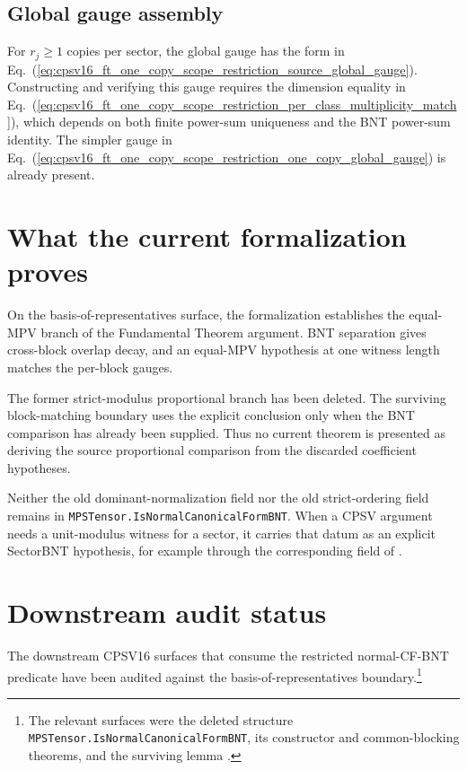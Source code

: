 \documentclass{article}
\begin{document}
\subsection{Global gauge assembly}

For $r_j\geq1$ copies per sector, the global gauge has the form in
Eq.~(\ref{eq:cpsv16_ft_one_copy_scope_restriction_source_global_gauge}).
Constructing and verifying this gauge requires the dimension equality in
Eq.~(\ref{eq:cpsv16_ft_one_copy_scope_restriction_per_class_multiplicity_match}),
which depends on both finite power-sum uniqueness and the BNT power-sum
identity. The simpler gauge in
Eq.~(\ref{eq:cpsv16_ft_one_copy_scope_restriction_one_copy_global_gauge}) is
already present.

\section{What the current formalization proves}

On the basis-of-representatives surface, the formalization establishes the
equal-MPV branch of the Fundamental Theorem argument. BNT separation gives
cross-block overlap decay, and an equal-MPV hypothesis at one witness length
matches the per-block gauges.

The former strict-modulus proportional branch has been deleted. The surviving
block-matching boundary uses the explicit conclusion
 only when the BNT comparison has
already been supplied. Thus no current theorem is presented as deriving the
source proportional comparison from the discarded coefficient hypotheses.

Neither the old dominant-normalization field nor the old strict-ordering field
remains in \texttt{MPSTensor.IsNormalCanonicalFormBNT}. When a CPSV argument needs a
unit-modulus witness for a sector, it carries that datum as an explicit
SectorBNT hypothesis, for example through the corresponding field of
.

\section{Downstream audit status}

The downstream CPSV16 surfaces that consume the restricted normal-CF-BNT
predicate have been audited against the basis-of-representatives
boundary.\footnote{The relevant \Lean{} surfaces were the deleted structure
\texttt{MPSTensor.IsNormalCanonicalFormBNT}, its constructor and common-blocking theorems,
and the surviving lemma
.}
\end{document}
